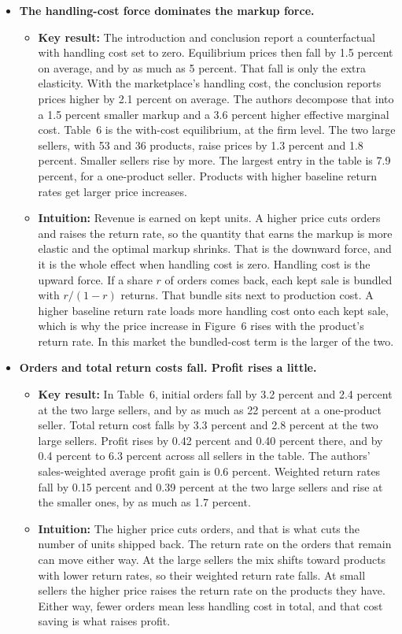 \documentclass[11pt]{article}
\begin{document}
\begin{itemize}
    \item \textbf{The handling-cost force dominates the markup force.}
    \begin{itemize}
        \item \textbf{Key result:} The introduction and conclusion report a counterfactual with handling cost set to zero. Equilibrium prices then fall by 1.5 percent on average, and by as much as 5 percent. That fall is only the extra elasticity. With the marketplace's handling cost, the conclusion reports prices higher by 2.1 percent on average. The authors decompose that into a 1.5 percent smaller markup and a 3.6 percent higher effective marginal cost. Table~6 is the with-cost equilibrium, at the firm level. The two large sellers, with 53 and 36 products, raise prices by 1.3 percent and 1.8 percent. Smaller sellers rise by more. The largest entry in the table is 7.9 percent, for a one-product seller. Products with higher baseline return rates get larger price increases.
        \item \textbf{Intuition:} Revenue is earned on kept units. A higher price cuts orders and raises the return rate, so the quantity that earns the markup is more elastic and the optimal markup shrinks. That is the downward force, and it is the whole effect when handling cost is zero. Handling cost is the upward force. If a share \(r\) of orders comes back, each kept sale is bundled with \(r/(1-r)\) returns. That bundle sits next to production cost. A higher baseline return rate loads more handling cost onto each kept sale, which is why the price increase in Figure~6 rises with the product's return rate. In this market the bundled-cost term is the larger of the two.
    \end{itemize}

    \item \textbf{Orders and total return costs fall. Profit rises a little.}
    \begin{itemize}
        \item \textbf{Key result:} In Table~6, initial orders fall by 3.2 percent and 2.4 percent at the two large sellers, and by as much as 22 percent at a one-product seller. Total return cost falls by 3.3 percent and 2.8 percent at the two large sellers. Profit rises by 0.42 percent and 0.40 percent there, and by 0.4 percent to 6.3 percent across all sellers in the table. The authors' sales-weighted average profit gain is 0.6 percent. Weighted return rates fall by 0.15 percent and 0.39 percent at the two large sellers and rise at the smaller ones, by as much as 1.7 percent.
        \item \textbf{Intuition:} The higher price cuts orders, and that is what cuts the number of units shipped back. The return rate on the orders that remain can move either way. At the large sellers the mix shifts toward products with lower return rates, so their weighted return rate falls. At small sellers the higher price raises the return rate on the products they have. Either way, fewer orders mean less handling cost in total, and that cost saving is what raises profit.
    \end{itemize}


\end{itemize}
\end{document}
